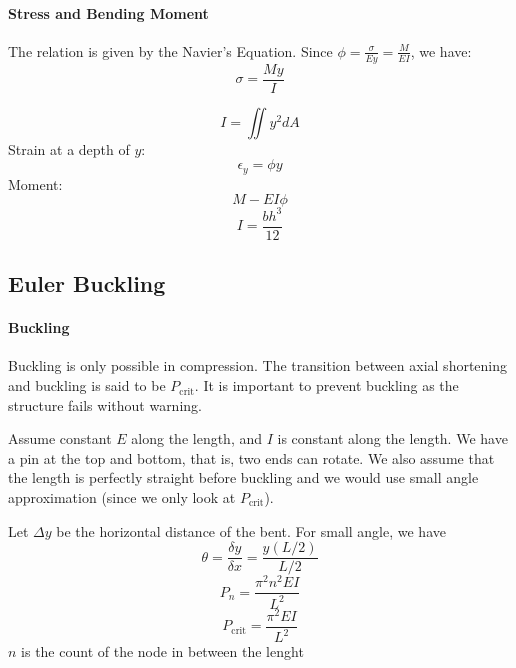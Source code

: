 \paragraph{Stress and Bending Moment} The relation is given by the Navier's Equation. Since $\phi = \frac{\sigma}{Ey} = \frac{M}{EI}$, we have:
\begin{equation}
    \sigma = \frac{My}{I}
\end{equation}
\begin{shaded}
    \begin{equation}
        I = \iint y^2 dA
    \end{equation}
    Strain at a depth of $y$:
    \begin{equation}
        \epsilon_y = \phi y
    \end{equation}
    Moment:
    \begin{equation}
        M - EI\phi
    \end{equation}
    \begin{equation}
        I = \frac{bh^3}{12}
    \end{equation}
\end{shaded}
\subsection{Euler Buckling}
\paragraph{Buckling} Buckling is only possible in compression. The transition between axial shortening and buckling is said to be $P_\text{crit}$. It is important to prevent buckling as the structure fails without warning.
\begin{definition}
    Assume constant $E$ along the length, and $I$ is constant along the length. We have a pin at the top and bottom, that is, two ends can rotate. We also assume that the length is perfectly straight before buckling and we would use small angle approximation (since we only look at $P_\text{crit}$). \\
    \par Let $\Delta y$ be the horizontal distance of the bent. For small angle, we have
    $$
    \theta = \frac{\delta y}{\delta x} = \frac{y(L/2)}{L/2} 
    $$
    $$
        P_n = \frac{\pi^2 n^2 EI}{L^2}
    $$
    $$
        P_\text{crit} = \frac{\pi^2 EI}{L^2}
    $$
    $n$ is the count of the node in between the lenght
\end{definition}
